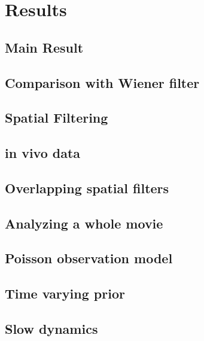 \section{Results}

\clearpage\newpage
\subsection{Main Result}


\clearpage\newpage
\subsection{Comparison with Wiener filter}


\clearpage\newpage
\subsection{Spatial Filtering}





\clearpage\newpage
\subsection{in vivo data}


\clearpage\newpage
\subsection{Overlapping spatial filters}


\clearpage\newpage
\subsection{Analyzing a whole movie}


\subsection{Poisson observation model}

\subsection{Time varying prior}

\subsection{Slow dynamics}


